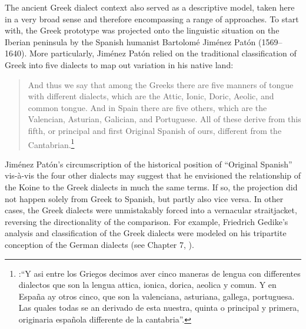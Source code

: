 The ancient Greek dialect context also served as a descriptive model, taken here in a very broad sense and therefore encompassing a range of approaches. To start with, the Greek prototype was projected onto the linguistic situation on the Iberian peninsula by the Spanish humanist Bartolomé Jiménez Patón (1569–1640). More particularly, Jiménez Patón relied on the traditional classification of Greek into five dialects to map out variation in his native land:

\begin{quote}
And thus we say that among the Greeks there are five manners of tongue with different dialects, which are the Attic, Ionic, Doric, Aeolic, and common tongue. And in Spain there are five others, which are the Valencian, Asturian, Galician, and Portuguese. All of these derive from this fifth, or principal and first Original Spanish of ours, different from the Cantabrian.\footnote{\citet[10\textsc{\textsuperscript{r}}\textsc{–10}\textsc{\textsuperscript{v}}]{Jimenez1604}:“Y asi entre los Griegos decimos aver cinco maneras de lengua con differentes dialectos que son la lengua attica, ionica, dorica, aeolica y comun. Y en España ay otros cinco, que son la valenciana, asturiana, gallega, portuguesa. Las quales todas se an derivado de esta nuestra, quinta o principal y primera, originaria española differente de la cantabria”.}
\end{quote}

Jiménez Patón’s circumscription of the historical position of “Original Spanish” vis-à-vis the four other dialects may suggest that he envisioned the relationship of the Koine to the Greek dialects in much the same terms. If so, the projection did not happen solely from Greek to Spanish, but partly also vice versa. In other cases, the Greek dialects were unmistakably forced into a vernacular straitjacket, reversing the directionality of the comparison. For example, Friedrich Gedike’s analysis and classification of the Greek dialects were modeled on his tripartite conception of the German dialects (see Chapter 7, ).

